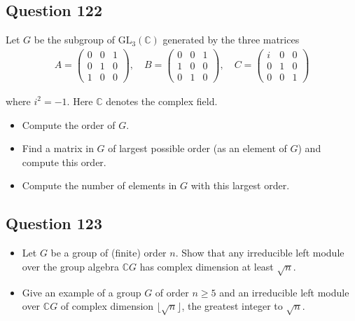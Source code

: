 \documentclass[12pt]{article}
\begin{document}
\hypertarget{question-122}{%
\subsection{Question 122}\label{question-122}}

Let \(G\) be the subgroup of \(\text{GL}_3(\mathbb C)\) generated by the
three matrices \begin{align*}
A=
\begin{pmatrix}
  0 & 0 & 1\\
  0 & 1 & 0\\
  1 & 0 & 0
\end{pmatrix},
\quad B=
\begin{pmatrix}
  0 & 0 & 1\\
  1 & 0 & 0\\
  0 & 1 & 0
\end{pmatrix},
\quad C=
\begin{pmatrix}
  i & 0 & 0\\
  0 & 1 & 0\\
  0 & 0 & 1
\end{pmatrix}
\end{align*}

where \(i^2=-1\). Here \(\mathbb C\) denotes the complex field.

\begin{itemize}
\item
  Compute the order of \(G\).
\item
  Find a matrix in \(G\) of largest possible order (as an element of
  \(G\)) and compute this order.
\item
  Compute the number of elements in \(G\) with this largest order.
\end{itemize}

\hypertarget{question-123}{%
\subsection{Question 123}\label{question-123}}

\begin{itemize}
\item
  Let \(G\) be a group of (finite) order \(n\). Show that any
  irreducible left module over the group algebra \(\mathbb CG\) has
  complex dimension at least \(\sqrt n\).
\item
  Give an example of a group \(G\) of order \(n\geq5\) and an
  irreducible left module over \(\mathbb CG\) of complex dimension
  \(\lfloor\sqrt n\rfloor\), the greatest integer to \(\sqrt n\).
\end{itemize}
\end{document}
